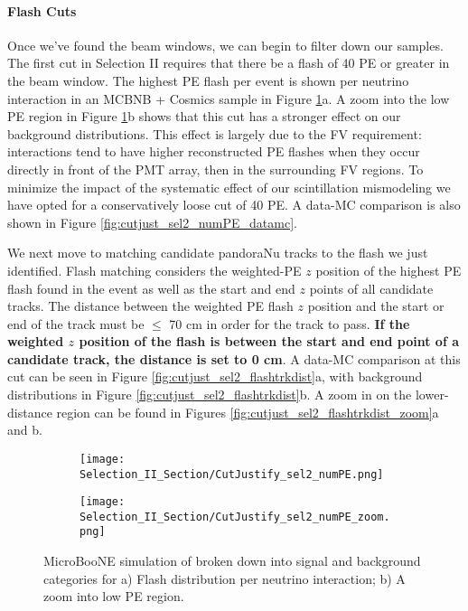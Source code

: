 \documentclass{article}
\begin{document}
\paragraph{Flash Cuts}
Once we've found the beam windows, we can begin to filter down our samples. The first cut in Selection II requires that there be a flash of 40 PE or greater in the beam window. The highest PE flash per event is shown per neutrino interaction in an MCBNB + Cosmics sample in Figure \ref{fig:cutjust_sel2_numPE}a. A zoom into the low PE region in Figure \ref{fig:cutjust_sel2_numPE}b shows that this cut has a stronger effect on our background distributions. This effect is largely due to the FV requirement: interactions tend to have higher reconstructed PE flashes when they occur directly in front of the PMT array, then in the surrounding FV regions. To minimize the impact of the systematic effect of our scintillation mismodeling \cite{bib:kazu_optical_bug} we have opted for a conservatively loose cut of 40 PE. A data-MC comparison is also shown in Figure \ref{fig:cutjust_sel2_numPE_datamc}.
\par We next move to matching candidate pandoraNu tracks to the flash we just identified.  Flash matching considers the weighted-PE $z$ position of the highest PE flash found in the event as well as the start and end $z$ points of all candidate tracks. The distance between the weighted PE flash $z$ position and the start or end of the track must be $\leq$ 70 cm in order for the track to pass. \textbf{If the weighted $z$ position of the flash is between the start and end point of a candidate track, the distance is set to 0 cm}. A data-MC comparison at this cut can be seen in Figure \ref{fig:cutjust_sel2_flashtrkdist}a, with background distributions in Figure \ref{fig:cutjust_sel2_flashtrkdist}b.  A zoom in on the lower-distance region can be found in Figures \ref{fig:cutjust_sel2_flashtrkdist_zoom}a and b. 


\begin{figure}[t!]
  \centering
  \begin{subfigure}[t]{0.4\textwidth}
    \centering
    \texttt{[image: Selection\_II\_Section/CutJustify\_sel2\_numPE.png]}
    \caption{ }
  \end{subfigure}
    \hspace{10 mm}
   \begin{subfigure}[t]{0.4\textwidth}
    \centering
    \texttt{[image: Selection\_II\_Section/CutJustify\_sel2\_numPE\_zoom.png]}
    \caption{ }
  \end{subfigure}
\caption{ MicroBooNE simulation of broken down into signal and background categories for a) Flash distribution per neutrino interaction; b) A zoom into low PE region. }
\label{fig:cutjust_sel2_numPE}
\end{figure}
\end{document}
